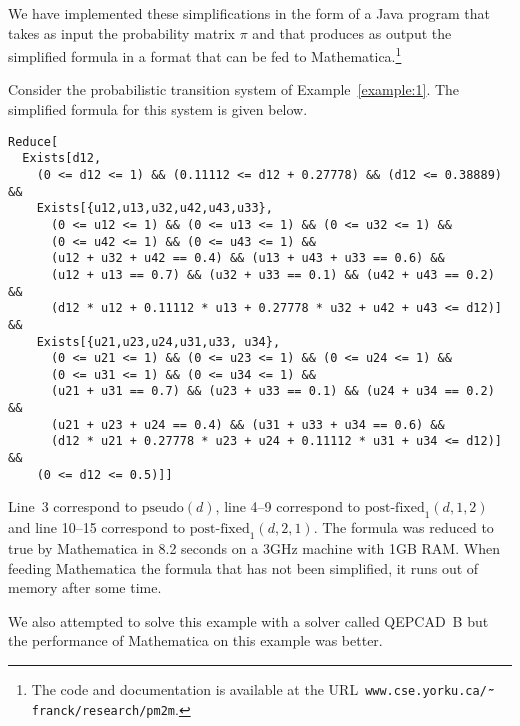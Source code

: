 \documentclass{LMCS}
\begin{document}
We have implemented these simplifications in the form of a Java program that takes
as input the probability matrix $\pi$ and that produces as output the simplified
formula in a format that can be fed to Mathematica.\footnote{The code and documentation is available at the URL\ 
{\tt www.cse.yorku.ca/$\raisebox{-0.5ex}{\mbox{\tt \~{}}}$franck/research/pm2m}.}

\begin{exa}
Consider the probabilistic transition system of Example~\ref{example:1}.
The simplified formula for this system is given below.

\begin{small}
\begin{lstlisting}
Reduce[
  Exists[d12,
    (0 <= d12 <= 1) && (0.11112 <= d12 + 0.27778) && (d12 <= 0.38889) && 
    Exists[{u12,u13,u32,u42,u43,u33}, 
      (0 <= u12 <= 1) && (0 <= u13 <= 1) && (0 <= u32 <= 1) && 
      (0 <= u42 <= 1) && (0 <= u43 <= 1) && 
      (u12 + u32 + u42 == 0.4) && (u13 + u43 + u33 == 0.6) && 
      (u12 + u13 == 0.7) && (u32 + u33 == 0.1) && (u42 + u43 == 0.2) && 
      (d12 * u12 + 0.11112 * u13 + 0.27778 * u32 + u42 + u43 <= d12)] && 
    Exists[{u21,u23,u24,u31,u33, u34}, 
      (0 <= u21 <= 1) && (0 <= u23 <= 1) && (0 <= u24 <= 1) && 
      (0 <= u31 <= 1) && (0 <= u34 <= 1) && 
      (u21 + u31 == 0.7) && (u23 + u33 == 0.1) && (u24 + u34 == 0.2) && 
      (u21 + u23 + u24 == 0.4) && (u31 + u33 + u34 == 0.6) && 
      (d12 * u21 + 0.27778 * u23 + u24 + 0.11112 * u31 + u34 <= d12)] && 
    (0 <= d12 <= 0.5)]]
\end{lstlisting}
\end{small}
Line~3 correspond to $\mbox{pseudo}(d)$, line 4--9 correspond to
$\mbox{post-fixed}_1(d, 1, 2)$ and line 10--15 correspond to
$\mbox{post-fixed}_1(d, 2, 1)$.  
The formula was reduced to true by Mathematica in 8.2 seconds on a 3GHz machine with 1GB RAM.
When feeding Mathematica the formula that has not been simplified, it runs out of
memory after some time.

We also attempted to solve this example with a solver called QEPCAD~B \cite{C03:jsac} but
the performance of Mathematica on this example was better.
\end{exa}
\end{document}
